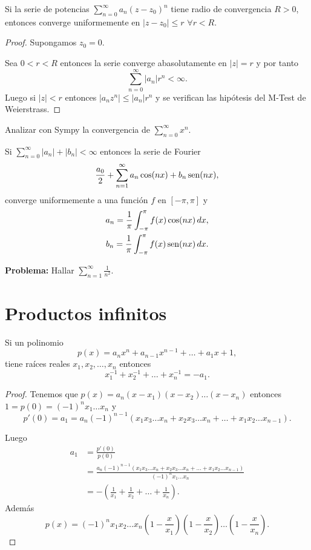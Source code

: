 \begin{corolario}{}
Si la serie de potencias $\sum\limits_{n=0}^{\infty} a_n (z-z_0)^n$ tiene radio de convergencia $R>0$, 
entonces converge uniformemente en $|z-z_0|\leq r$ $\forall r<R$.
\end{corolario}

\begin{proof}
Supongamos $z_0=0$.

Sea $0<r<R$ entonces la serie converge abasolutamente en $|z|=r$ y por tanto 
\[
\sum\limits_{n=0}^{\infty}|a_n|r^n
<\infty.\]
Luego si $|z|<r$ entonces $|a_nz^n|\leq |a_n|r^n$ y se verifican las hipótesis del M-Test de Weierstrass.
\end{proof}

\begin{ejemplo}{}
Analizar con Sympy la convergencia de $\sum\limits_{n=0}^{\infty} x^n$.
\end{ejemplo}

\begin{corolario}{}
Si $\sum\limits_{n=0}^{\infty}|a_n|+|b_n|<\infty$ entonces la serie de Fourier 
\[
\frac{a_0}{2}+\sum\limits_{n=1}^{\infty} a_n \cos(nx)+b_n \operatorname{sen}(nx),
\]
converge uniformemente a una función $f$ en $[-\pi,\pi]$ y 
\[
\begin{split}
a_n=\frac{1}{\pi}\int_{-\pi}^{\pi} f(x)\cos(nx)\,dx,\\
b_n=\frac{1}{\pi}\int_{-\pi}^{\pi} f(x)\operatorname{sen}(nx)\,dx.
\end{split}
\]
\end{corolario}

\textbf{Problema:} Hallar $\sum\limits_{n=1}^{\infty} \frac{1}{n^2}$.


\section{Productos infinitos}

Si un polinomio
\[
p(x)=a_nx^n+a_{n-1}x^{n-1}+\ldots+a_1x+1,
\]
tiene raíces reales $x_1,x_2,\ldots,x_n$ entonces
\[
x_1^{-1}+x_2^{-1}+\ldots+x_n^{-1}=-a_1.
\]

\begin{proof}
Tenemos que $p(x)=a_n(x-x_1)(x-x_2)\ldots(x-x_n)$ entonces $1=p(0)=(-1)^n x_1\ldots x_n$
y \[p'(0)=a_1=a_n (-1)^{n-1}(x_1x_3\ldots x_n+x_2x_3\ldots x_n+\ldots +x_1x_2\ldots x_{n-1}).\]

Luego
\[
\begin{split}
a_1&=\frac{p'(0)}{p(0)}
\\
&=\frac{a_n (-1)^{n-1}(x_1x_3\ldots x_n+x_2x_3\ldots x_n+\ldots +x_1x_2\ldots x_{n-1})}{(-1)^n x_1\ldots x_n}
\\&=
-\left(\frac{1}{x_1}+\frac{1}{x_2}+\ldots+\frac{1}{x_n}\right).
\end{split}
\]
Además 
\[
p(x)=(-1)^n x_1x_2\ldots x_n \left(1-\frac{x}{x_1}\right) \left(1-\frac{x}{x_2}\right)\ldots \left(1-\frac{x}{x_n}\right).
\]
\end{proof}

